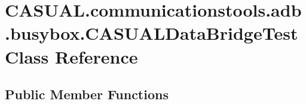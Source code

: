 \hypertarget{class_c_a_s_u_a_l_1_1communicationstools_1_1adb_1_1busybox_1_1_c_a_s_u_a_l_data_bridge_test}{\section{C\-A\-S\-U\-A\-L.\-communicationstools.\-adb.\-busybox.\-C\-A\-S\-U\-A\-L\-Data\-Bridge\-Test Class Reference}
\label{class_c_a_s_u_a_l_1_1communicationstools_1_1adb_1_1busybox_1_1_c_a_s_u_a_l_data_bridge_test}
}
\subsection*{Public Member Functions}

